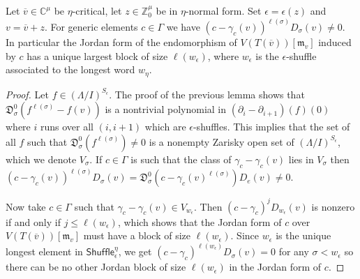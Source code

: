 \documentclass[11pt,fleqn]{article}
\newcommand\CC{\mathbb C}
\newcommand\ZZ{\mathbb Z}
\newcommand\DD{\mathfrak D}
\newcommand\m{\mathfrak m}
\newcommand\vv{\overline{v}}
\newcommand\Shuffle{\mathsf{Shuffle}}
\begin{document}
\begin{Proposition}
Let $\vv \in \CC^\mu$ be $\eta$-critical, let $z \in \ZZ^\mu_0$ be in 
$\eta$-normal form. Set $\epsilon = \epsilon(z)$ and $v = \vv + z$. 
For generic elements $c \in \Gamma$ we have $(c-\gamma_c(v))^{\ell(\sigma)} 
D_\sigma(v) \neq 0$. In particular the Jordan form of the endomorphism of 
$V(T(\vv))[\m_{v}]$ induced by $c$ has a unique largest block of size 
$\ell(w_\epsilon)$, where $w_\epsilon$ is the $\epsilon$-shuffle associated to 
the longest word $w_\eta$. 
\end{Proposition}
\begin{proof}
Let $f \in (\Lambda/I)^{S_\epsilon}$. The proof of the previous lemma shows 
that $\DD_\sigma^0(f^{\ell(\sigma)} - f(v))$ is a nontrivial polynomial in 
$(\partial_i - \partial_{i+1})(f)(0)$ where $i$ runs over all $(i,i+1)$ which 
are $\epsilon$-shuffles. This implies that the set of all $f$ such that 
$\DD_\sigma^0(f^{\ell(\sigma)}) \neq 0$ is a nonempty Zarisky open set of 
$(\Lambda/I)^{S_\epsilon}$, which we denote $V_\sigma$. If $c \in \Gamma$ 
is such that the class of $\gamma_c - \gamma_c(v)$ lies in $V_\sigma$
then $(c- \gamma_c(v))^{\ell(\sigma)} D_\sigma(v) = \DD_\sigma^0(c - 
\gamma_c(v)^{\ell(\sigma)}) D_e(v) \neq 0$.

Now take $c \in \Gamma$ such that $\gamma_c - \gamma_c(v) \in V_{w_\epsilon}$.
Then $(c-\gamma_c)^j D_{w_\epsilon}(v)$ is nonzero if and only if $j \leq 
\ell(w_\epsilon)$, which shows that the Jordan form of $c$ over 
$V(T(\vv))[\m_v]$ must have a block of size $\ell(w_\epsilon)$. Since 
$w_\epsilon$ is the unique longest element in $\Shuffle_\epsilon^\eta$, we
get $(c-\gamma_c)^{\ell(w_\epsilon)} D_\sigma(v) = 0$ for any $\sigma < 
w_\epsilon$ so there can be no other Jordan block of size $\ell(w_\epsilon)$
in the Jordan form of $c$.
\end{proof}

\begin{bibdiv}
\begin{biblist}
\end{biblist}
\end{bibdiv}
\end{document}
